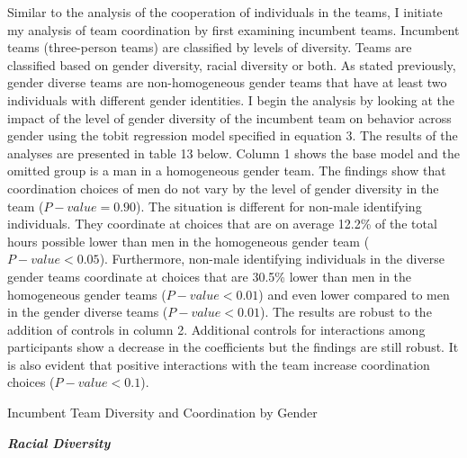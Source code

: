 \noindent Similar to the analysis of the cooperation of individuals in the teams, I initiate my analysis of team coordination by first examining incumbent teams. Incumbent teams (three-person teams) are classified by levels of diversity. Teams are classified based on gender diversity, racial diversity or both. As stated previously, gender diverse teams are non-homogeneous gender teams that have at least two individuals with different gender identities. I begin the analysis by looking at the impact of the level of gender diversity of the incumbent team on behavior across gender using the tobit regression model specified in equation 3. The results of the analyses are presented in table 13 below. Column 1 shows the base model and the omitted group is a man in a homogeneous gender team. The findings show that coordination choices of men do not vary by the level of gender diversity in the team ($P-value=0.90$). The situation is different for non-male identifying individuals. They coordinate at choices that are on average 12.2\% of the total hours possible lower than men in the homogeneous gender team ($P-value<0.05$). Furthermore, non-male identifying individuals in the diverse gender teams coordinate at choices that are 30.5\% lower than men in the homogeneous gender teams ($P-value<0.01$) and even lower compared to men in the gender diverse teams ($P-value<0.01$). The results are robust to the addition of controls in column 2. Additional controls for interactions among participants show a decrease in the coefficients but the findings are still robust. It is also evident that positive interactions with the team increase coordination choices ($P-value<0.1$). 

\begin{table}[H]
 \captionsetup{justification=raggedright,singlelinecheck=false}
\caption{Incumbent Team Diversity and Coordination by Gender } \label{tab:table8}
    \begin{center}
        
    \end{center}
\end{table}

\noindent\textbf{\textit{Racial Diversity}} 

